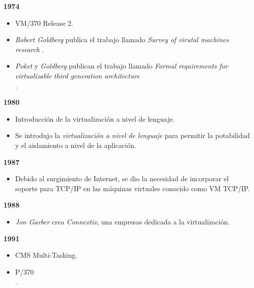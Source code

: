 \textbf{1974}\\
\begin{itemize}
	\item VM/370 Release 2.\\
	
	\item \textit{Robert Goldberg} publica el trabajo llamado \textit{Survey of virutal machines research} \parencite{Goldberg1974}.\\
	
	\item \textit{Poket} y \textit{Goldberg} publican el trabajo llamado \textit{Formal requirements for virtualizable third generation architecture} \parencite{Popek1974}\\.
\end{itemize}


\textbf{1980}\\
\begin{itemize}
	\item Introducción de la virtualización a nivel de lenguaje.\\
	
	\item Se introdujo la \textit{virtualización a nivel de lenguaje} para permitir la potabilidad y el aislamiento a nivel de la aplicación\parencite{Douglis2013}. \\ 
\end{itemize}

\textbf{1987}\\
\begin{itemize}
	\item Debido al surgimiento de Internet, se dio la necesidad de incorporar el soporte para TCP/IP en las máquinas virtuales conocido como VM TCP/IP.\\
\end{itemize}

\textbf{1988}\\
\begin{itemize}
	\item \textit{Jon Garber} crea \textit{Connextix},  una empresas dedicada a la virtualización.\\
\end{itemize}


\textbf{1991}\\
\begin{itemize}
	\item CMS Multi-Tasking.\\
	
	\item P/370 \\.
\end{itemize}


